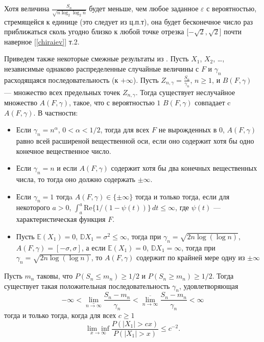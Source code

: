 \begin{remark} 

Хотя величина $\frac{S_n}{\sqrt{n \log_2 \log_2 n}}$ будет меньше, чем любое заданное  $\varepsilon$  с вероятностью, стремящейся к единице (это следует из ц.п.т), она будет бесконечное число раз приближаться сколь угодно близко к любой точке отрезка [$-\sqrt{2}, \sqrt{2}$] почти наверное [\ref{chiraiev}] т.2.

Приведем также некоторые смежные результаты из \cite{Gupta}. Пусть $X_1$, $X_2$, \dots, независимые однаково распределенные случайные величины с $F$ и $\gamma_n$ расходящаяся последовательность (к $+\infty$). Пусть $Z_{n,\gamma}  = \frac{S_n}{\gamma_n}$, $n\geq 1$, и $B(F,\gamma)$ --- множество всех предельных точек $Z_{n,\gamma}$. Тогда существует неслучайное множество $A(F,\gamma)$, такое, что с вероятностью $1$ $B(F,\gamma)$ совпадает c $A(F,\gamma)$.  В частности:
\begin{itemize}
\item Если $\gamma_n = n^{\alpha}$, $0<\alpha<1/2$, тогда для всех $F$ не вырожденных в $0$, $A(F,\gamma)$ равно всей расширеной вещественной оси, если оно содержит хотя бы одно конечное вещественное число.
\item Если $\gamma_n = n$ и если $A(F,\gamma)$ содержит хотя бы два конечных вещественных числа, то тогда оно должно содержать $\pm\infty$.
\item Если $\gamma_n=1$ тогдa $A(F,\gamma) \in \{\pm\infty\}$ тогда и только тогда, если для некоторого $a>0$, $\int_{a}^a \text{Re}\{1/(1-\psi(t))\}\,dt\leq \infty$, где $\psi(t)$ --- характеристическая функция $F$.
\item Пусть $\mathbb{E}(X_1)=0$, $\mathbb{D}X_1 = \sigma^2\leq{\infty}$, тогда при $\gamma_n=\sqrt{2n\log(\log n)}$, $A(F,\gamma) = [-\sigma,\sigma]$, а если $\mathbb{E}(X_1)=0$, $\mathbb{D}X_1 = \infty$, тогда при $\gamma_n=\sqrt{2n\log(\log n)}$, то $A(F,\gamma)$ содержит по крайней мере одну из $\pm\infty$
\end{itemize}
Пусть $m_n$ таковы, что $P(S_n\leq m_n)\geq 1/2$ и $P(S_n\geq m_n)\geq 1/2$. Тогда существует такая положительная последовательность $\gamma_n$, удовлетворяющая $$-\infty< \underset{n \rightarrow \infty}{\underline{\lim} } \frac{S_n-m_n}{\gamma_n}<
\underset{n \rightarrow \infty}{\overline{\lim} }\frac{S_n-m_n}{\gamma_n}<\infty$$ тогда и только тогда, когда для всех $c\geq 1$
$$\underset{x\to\infty}{\lim\inf}\frac{P(|X_1|>cx)}{P(|X_1|>x)}\leq c^{-2}.$$
\end{remark}



